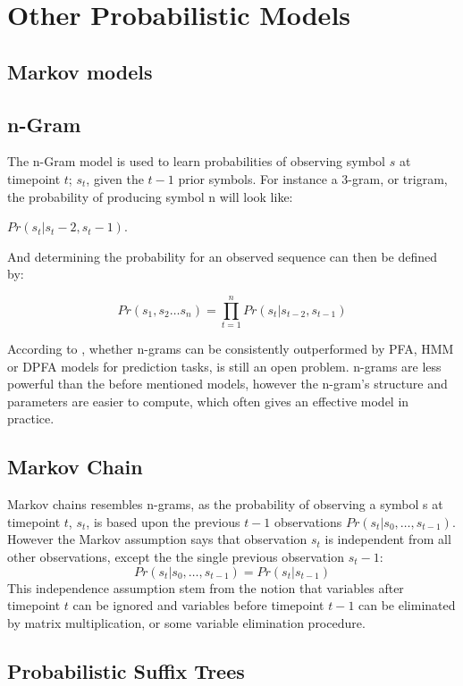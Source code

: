 \section{Other Probabilistic Models}
\subsection{Markov models}

\subsection{n-Gram}
The n-Gram model is used to learn probabilities of observing symbol $s$ at timepoint $t$; $s_t$, given the $t-1$ prior symbols. For instance a 3-gram, or trigram, the probability of producing symbol n will look like: 
\begin{description}
\item $Pr(s_t | s_t-2, s_t-1)$. 
\end{description}
And determining the probability for an observed sequence can then be defined by:
\begin{description}
\item $$Pr(s_1, s_2 \dots s_n) = \prod_{t = 1}^{n} Pr(s_t | s_{t-2}, s_{t-1})$$ \cite{Notesw4705}
\end{description}
According to \cite{pautomacTR}, whether n-grams can be consistently outperformed by PFA, HMM or DPFA models for prediction tasks, is still an open problem. n-grams are less powerful than the before mentioned models, however the n-gram’s structure and parameters are easier to compute, which often gives an effective model in practice.

\subsection{Markov Chain}
Markov chains resembles n-grams, as the probability of observing a symbol s at timepoint $t$, $s_t$, is based upon the previous $t-1$ observations $Pr(s_t | s_0, \dots ,s_{t-1})$. However the Markov assumption says that observation $s_t$ is independent from all other observations, except the the single previous observation $s_t-1$:
$$Pr(s_t | s_0, \dots ,s_{t-1}) = Pr(s_t | s_{t-1})$$
This independence assumption stem from the notion that variables after timepoint $t$ can be ignored and variables before timepoint $t-1$ can be eliminated by matrix multiplication, or some variable elimination procedure. \cite{poole2010artificial}

\subsection{Probabilistic Suffix Trees}
